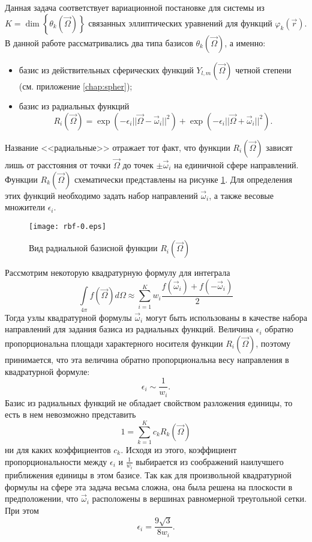 Данная задача соответствует вариационной постановке для системы из $K = \operatorname{dim} \left\{\theta_k(\vec \Omega)\right\}$ связанных эллиптических уравнений для функций $\varphi_k(\vec r)$.
В данной работе рассматривались два типа базисов $\theta_k(\vec \Omega)$, а именно:
\begin{itemize}
\item базис из действительных сферических функций $Y_{l,m}(\vec \Omega)$ четной степени (см. приложение \ref{chap:spher});
\item базис из радиальных функций
\[
R_i(\vec \Omega) = \exp(-\epsilon_i||\vec \Omega - \vec \omega_i||^2) + \exp(-\epsilon_i||\vec \Omega + \vec \omega_i||^2).
\]
\end{itemize}
Название <<радиальные>> отражает тот факт, что функции $R_i(\vec \Omega)$ зависят лишь от расстояния от точки $\vec \Omega$ до точек $\pm \vec \omega_i$ на единичной сфере направлений.
Функции $R_k(\vec \Omega)$ схематически представлены на рисунке \ref{fig:rbf}. Для определения этих функций необходимо задать набор направлений $\vec \omega_i$, а также весовые множители $\epsilon_i$. 
\begin{figure}[ht!]
\centering
\texttt{[image: rbf-0.eps]}
\caption{Вид радиальной базисной функции $R_i(\vec \Omega)$}
\label{fig:rbf}
\end{figure}

Рассмотрим некоторую квадратурную формулу для интеграла
\[
\int\limits_{4\pi} f(\vec \Omega) d\Omega \approx \sum_{i=1}^K w_i \frac{f(\vec \omega_i) + f(-\vec \omega_i)}{2}
\]
Тогда узлы квадратурной формулы $\vec \omega_i$ могут быть использованы в качестве набора направлений для задания базиса из радиальных функций. Величина $\epsilon_i$ обратно пропорциональна площади характерного носителя функции $R_i(\vec \Omega)$, поэтому принимается, что эта величина обратно пропорциональна весу направления в квадратурной формуле:
\[
\epsilon_i \sim \frac{1}{w_i}.
\]
Базис из радиальных функций не обладает свойством разложения единицы, то есть в нем невозможно представить
\[
1 = \sum_{k = 1}^{K} c_k R_k(\vec \Omega)
\]
ни для каких коэффициентов $c_k$. Исходя из этого, коэффициент пропорциональности между $\epsilon_i$ и $\frac{1}{w_i}$ выбирается из соображений наилучшего приближения единицы в этом базисе. Так как для произвольной квадратурной формулы на сфере эта задача весьма сложна, она была решена на плоскости в предположении, что $\vec \omega_i$ расположены в вершинах равномерной треугольной сетки. При этом
\[
\epsilon_i = \frac{9\sqrt{3}}{8w_i}.
\]

